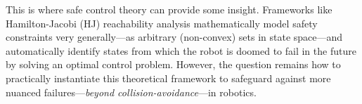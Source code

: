 



This is where safe control theory can provide some insight. 
Frameworks like Hamilton-Jacobi (HJ) reachability analysis \cite{mitchell2005time, lygeros2004reachability} mathematically model safety constraints very generally---as arbitrary (non-convex) sets in state space---and automatically identify states from which the robot is doomed to fail in the future by solving an optimal control problem. 
However, the question remains how to practically instantiate this theoretical framework to safeguard against more nuanced failures---\emph{beyond collision-avoidance}---in robotics. 



